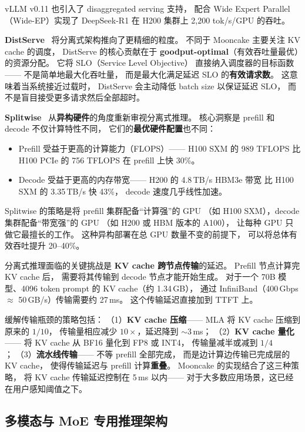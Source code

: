 vLLM v0.11 也引入了 disaggregated serving 支持，
配合 Wide Expert Parallel（Wide-EP）实现了
DeepSeek-R1 在 H200 集群上 2,200 tok/s/GPU 的吞吐。

\textbf{DistServe}~\cite{zhong2024distserve}
将分离式架构推向了更精细的粒度。
不同于 Mooncake 主要关注 KV cache 的调度，
DistServe 的核心贡献在于
\textbf{goodput-optimal}（有效吞吐量最优）的资源分配。
它将 SLO（Service Level Objective）
直接纳入调度器的目标函数——
不是简单地最大化吞吐量，
而是最大化满足延迟 SLO 的\textbf{有效请求数}。
这意味着当系统接近过载时，
DistServe 会主动降低 batch size 以保证延迟 SLO，
而不是盲目接受更多请求然后全部超时。

\textbf{Splitwise}~\cite{patel2024splitwise}
从\textbf{异构硬件}的角度重新审视分离式推理。
核心洞察是 prefill 和 decode 不仅计算特性不同，
它们的\textbf{最优硬件配置}也不同：
\begin{itemize}[noitemsep]
  \item Prefill 受益于更高的计算能力（FLOPS）——
        H100 SXM 的 989 TFLOPS 比 H100 PCIe 的 756 TFLOPS
        在 prefill 上快 30\%。
  \item Decode 受益于更高的内存带宽——
        H200 的 4.8\,TB/s HBM3e 带宽
        比 H100 SXM 的 3.35\,TB/s 快 43\%，
        decode 速度几乎线性加速。
\end{itemize}
Splitwise 的策略是将 prefill 集群配备“计算强”的 GPU
（如 H100 SXM），decode 集群配备“带宽强”的 GPU
（如 H200 或 HBM 版本的 A100），
让每种 GPU 只做它最擅长的工作。
这种异构部署在总 GPU 数量不变的前提下，
可以将总体有效吞吐提升 20--40\%。

分离式推理面临的关键挑战是
\textbf{KV cache 跨节点传输}的延迟。
Prefill 节点计算完 KV cache 后，
需要将其传输到 decode 节点才能开始生成。
对于一个 70B 模型、4096 token prompt 的 KV cache（约 1.34\,GB），
通过 InfiniBand（400\,Gbps $\approx$ 50\,GB/s）传输需要约 27\,ms。
这个传输延迟直接加到 TTFT 上。

缓解传输瓶颈的策略包括：
（1）\textbf{KV cache 压缩}——
MLA 将 KV cache 压缩到原来的 $1/10$，
传输量相应减少 $10\times$，延迟降到 $\sim$3\,ms；
（2）\textbf{KV cache 量化}——
将 KV cache 从 BF16 量化到 FP8 或 INT4，
传输量减半或减到 $1/4$；
（3）\textbf{流水线传输}——
不等 prefill 全部完成，
而是边计算边传输已完成层的 KV cache，
使得传输延迟与 prefill 计算\textbf{重叠}。
Mooncake 的实现结合了这三种策略，
将 KV cache 传输延迟控制在 5\,ms 以内——
对于大多数应用场景，这已经在用户感知阈值之下。

\subsection{多模态与 MoE 专用推理架构}

